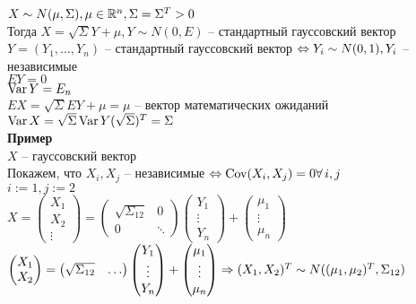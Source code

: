 \documentclass[12pt]{article}
\begin{document}
$X \sim N(\mu, \Sigma), \mu \in \mathbb{R}^n, \Sigma = \Sigma^T > 0$\\
Тогда $X = \sqrt{\Sigma}Y + \mu, Y \sim N(0, E)$ -- стандартный гауссовский вектор\\
$Y = (Y_1, \ldots, Y_n)$ -- стандартный гауссовский вектор $\Leftrightarrow Y_i \sim N(0, 1), Y_i$ -- независимые\\
$EY = 0$\\
$\operatorname{Var} Y = E_n$\\
$EX = \sqrt{\Sigma}EY + \mu = \mu$ -- вектор математических ожиданий\\
$\operatorname{Var} X = \sqrt{\Sigma}\operatorname{Var} Y (\sqrt{\Sigma})^T = \Sigma$\\
\textbf{Пример}\\
$X$ -- гауссовский вектор\\
Покажем, что $X_i, X_j$ -- независимые $\Leftrightarrow \operatorname{Cov}(X_i, X_j) = 0 \forall\, i, j$\\
$i := 1, j := 2$\\
$X = \begin{pmatrix}
    X_1\\X_2\\\vdots
\end{pmatrix} = \begin{pmatrix}
    \sqrt{\Sigma_{12}} & 0\\
    0 & \ddots
\end{pmatrix}\begin{pmatrix}
    Y_1\\\vdots\\Y_n
\end{pmatrix} + \begin{pmatrix}
    \mu_1\\\vdots\\\mu_n
\end{pmatrix}$\\
$\begin{pmatrix}
    X_1\\X_2\\
\end{pmatrix} = \begin{pmatrix}
    \sqrt{\Sigma_{12}} & \ldots\\
\end{pmatrix}\begin{pmatrix}
    Y_1\\\vdots\\Y_n
\end{pmatrix} + \begin{pmatrix}
    \mu_1\\\vdots\\\mu_n
\end{pmatrix} \Rightarrow (X_1, X_2)^T \sim N((\mu_1, \mu_2)^T, \Sigma_{12})$\\
\end{document}
